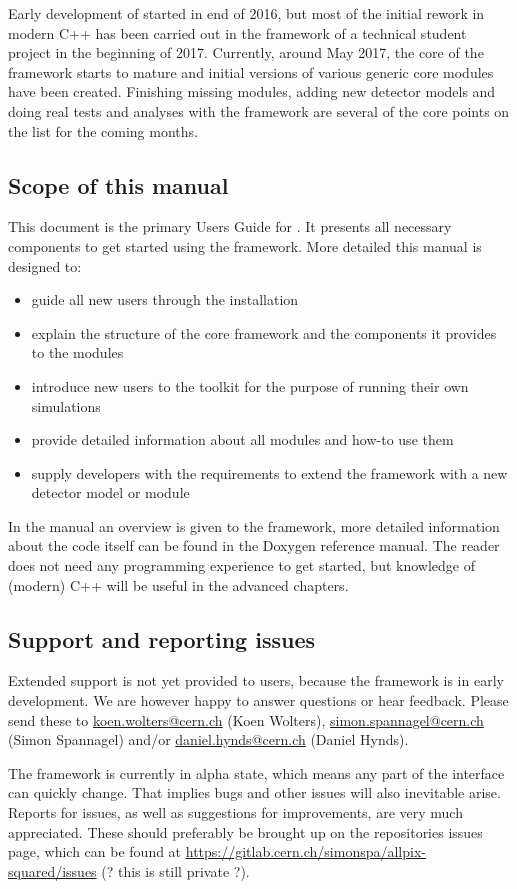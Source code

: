 Early development of \apsq started in end of 2016, but most of the initial rework in modern C++ has been carried out in the framework of a technical student project in the beginning of 2017. Currently, around May 2017, the core of the framework starts to mature and initial versions of various generic core modules have been created. Finishing missing modules, adding new detector models and doing real tests and analyses with the framework are several of the core points on the list for the coming months. 

\subsection{Scope of this manual}
This document is the primary Users Guide for \apsq. It presents all necessary components to get started using the framework. More detailed this manual is designed to:
\begin{itemize}
\item guide all new users through the installation 
\item explain the structure of the core framework and the components it provides to the modules
\item introduce new users to the toolkit for the purpose of running their own simulations
\item provide detailed information about all modules and how-to use them
\item supply developers with the requirements to extend the framework with a new detector model or module
\end{itemize}

In the manual an overview is given to the framework, more detailed information about the code itself can be found in the Doxygen reference manual. The reader does not need any programming experience to get started, but knowledge of (modern) C++ will be useful in the advanced chapters.

\subsection{Support and reporting issues}
Extended support is not yet provided to users, because the framework is in early development. We are however happy to answer questions or hear feedback. Please send these to \href{mailto:koen.wolters@cern.ch}{koen.wolters@cern.ch} (Koen Wolters), \href{mailto:simon.spannagel@cern.ch}{simon.spannagel@cern.ch} (Simon Spannagel) and/or \href{mailto:daniel.hynds@cern.ch}{daniel.hynds@cern.ch} (Daniel Hynds).

The \apsq framework is currently in alpha state, which means any part of the interface can quickly change. That implies bugs and other issues will also inevitable arise. Reports for issues, as well as suggestions for improvements, are very much appreciated. These should preferably be brought up on the repositories issues page, which can be found at \url{https://gitlab.cern.ch/simonspa/allpix-squared/issues} (? this is still private ?).
